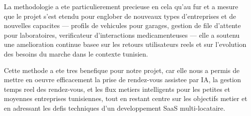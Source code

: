 La methodologie a ete particulierement precieuse en cela qu'au fur et a
mesure que le projet s'est etendu pour englober de nouveaux types
d'entreprises et de nouvelles capacites --- profils de vehicules pour
garages, gestion de file d'attente pour laboratoires, verificateur
d'interactions medicamenteuses --- elle a soutenu une amelioration
continue basee sur les retours utilisateurs reels et sur l'evolution
des besoins du marche dans le contexte tunisien.

Cette methode a ete tres benefique pour notre projet, car elle nous a
permis de mettre en oeuvre efficacement la prise de rendez-vous assistee
par IA, la gestion temps reel des rendez-vous, et les flux metiers
intelligents pour les petites et moyennes entreprises tunisiennes, tout
en restant centre sur les objectifs metier et en adressant les defis
techniques d'un developpement SaaS multi-locataire.

